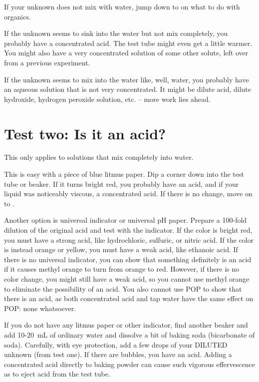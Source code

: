 If your unknown does not mix with water, 
jump down to  on what to do with organics.

If the unknown seems to sink into the water but not mix completely, 
you probably have a concentrated acid. 
The test tube might even get a little warmer. 
You might also have a very concentrated solution of some other solute, 
left over from a previous experiment.

If the unknown seems to mix into the water like, 
well, 
water, 
you probably have an aqueous solution that is not very concentrated. 
It might be dilute acid, 
dilute hydroxide, 
hydrogen peroxide solution, 
etc. -- more work lies ahead.

\section{Test two: Is it an acid?}

This only applies to solutions that mix completely into water.

This is easy with a piece of blue litmus paper. 
Dip a corner down into the test tube or beaker. 
If it turns bright red, 
you probably have an acid, 
and if your liquid was noticeably viscous, 
a concentrated acid. 
If there is no change, 
move on to .

Another option is universal indicator or universal pH paper. 
Prepare a 100-fold dilution of the original acid 
and test with the indicator. 
If the color is bright red, 
you must have a strong acid, 
like hydrochloric, 
sulfuric, 
or nitric acid. 
If the color is instead orange or yellow, 
you must have a weak acid, 
like ethanoic acid. 
If there is no universal indicator, 
you can show that something definitely is an acid 
if it causes methyl orange to turn from orange to red. 
However, 
if there is no color change, 
you might still have a weak acid, 
so you cannot use methyl orange to eliminate the possibility of an acid. 
You also cannot use POP to show that there is an acid, 
as both concentrated acid and tap water have the same effect on POP: 
none whatsoever.

If you do not have any litmus paper or other indicator, 
find another beaker and add 10-20~mL of ordinary water 
and dissolve a bit of baking soda (bicarbonate of soda). 
Carefully, 
with eye protection, 
add a few drops of your DILUTED unknown (from test one). 
If there are bubbles, 
you have an acid. 
Adding a concentrated acid directly to baking powder 
can cause such vigorous effervescence as to eject acid from the test tube.

